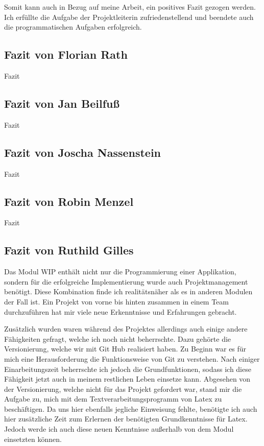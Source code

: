Somit kann auch in Bezug auf meine Arbeit, ein positives Fazit gezogen werden. Ich erfüllte die Aufgabe der Projektleiterin zufriedenstellend und beendete auch die programmatischen Aufgaben erfolgreich.

\subsection{Fazit von Florian Rath}

Fazit

\subsection{Fazit von Jan Beilfuß}

Fazit

\subsection{Fazit von Joscha Nassenstein}

Fazit

\subsection{Fazit von Robin Menzel}

Fazit

\subsection{Fazit von Ruthild Gilles}

Das Modul WIP enthält nicht nur die Programmierung einer Applikation, sondern für die erfolgreiche Implementierung wurde auch Projektmanagement benötigt. Diese Kombination finde ich realitätsnäher als es in anderen Modulen der Fall ist. Ein Projekt von vorne bis hinten zusammen in einem Team durchzuführen hat mir viele neue Erkenntnisse und Erfahrungen gebracht.

Zusätzlich wurden waren während des Projektes allerdings auch einige andere Fähigkeiten gefragt, welche ich noch nicht beherrschte. Dazu gehörte die Versionierung, welche wir mit Git Hub realisiert haben. Zu Beginn war es für mich eine Herausforderung die Funktionsweise von Git zu verstehen. Nach einiger Einarbeitungszeit beherrschte ich jedoch die Grundfunktionen, sodass ich diese Fähigkeit jetzt auch in meinem restlichen Leben einsetze kann. Abgesehen von der Versionierung, welche nicht für das Projekt gefordert war, stand mir die Aufgabe zu, mich mit dem Textverarbeitungsprogramm von Latex zu beschäftigen. Da uns hier ebenfalls jegliche Einweisung fehlte, benötigte ich auch hier zusätzliche Zeit zum Erlernen der benötigten Grundkenntnisse für Latex. Jedoch werde ich auch diese neuen Kenntnisse außerhalb von dem Modul einsetzten können.

